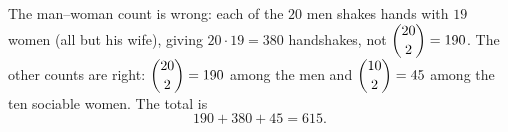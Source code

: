 The man--woman count is wrong: each of the $20$ men shakes hands with $19$ women (all but his wife), giving $20\cdot19=380$ handshakes, not $\dbinom{20}{2}=190$. The other counts are right: $\dbinom{20}{2}=190$ among the men and $\dbinom{10}2=45$ among the ten sociable women. The total is
\[190+380+45=\boxed{615}.\]
